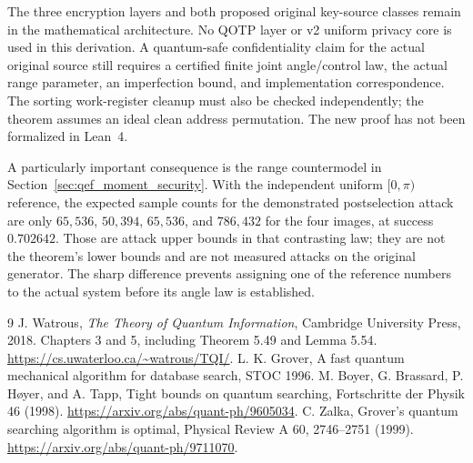 \documentclass[11pt,a4paper]{article}
\begin{document}
The three encryption layers and both proposed original key-source
classes remain in the mathematical architecture. No QOTP layer or v2
uniform privacy core is used in this derivation. A quantum-safe
confidentiality claim for the actual original source still requires a
certified finite joint angle/control law, the actual range parameter,
an imperfection bound, and implementation correspondence. The sorting
work-register cleanup must also be checked independently; the theorem
assumes an ideal clean address permutation. The new proof has not been
formalized in Lean~4.

A particularly important consequence is the range countermodel in
Section~\ref{sec:qef_moment_security}. With the independent uniform
$[0,\pi)$ reference, the expected sample counts for the demonstrated
postselection attack are only $65,536$, $50,394$, $65,536$, and $786,432$
for the four images, at success $0.702642$. Those are attack upper
bounds in that contrasting law; they are not the theorem's lower bounds
and are not measured attacks on the original generator. The sharp
difference prevents assigning one of the reference numbers to the
actual system before its angle law is established.

\begin{thebibliography}{9}
 J. Watrous, \emph{The Theory of Quantum
Information}, Cambridge University Press, 2018. Chapters 3 and 5,
including Theorem 5.49 and Lemma 5.54.
\url{https://cs.uwaterloo.ca/~watrous/TQI/}.
 L. K. Grover, A fast quantum mechanical algorithm for
database search, STOC 1996.
 M. Boyer, G. Brassard, P. H{\o}yer, and A. Tapp,
Tight bounds on quantum searching, Fortschritte der Physik 46
(1998). \url{https://arxiv.org/abs/quant-ph/9605034}.
 C. Zalka, Grover's quantum searching algorithm
is optimal, Physical Review A 60, 2746--2751 (1999).
\url{https://arxiv.org/abs/quant-ph/9711070}.
\end{thebibliography}
\end{document}
